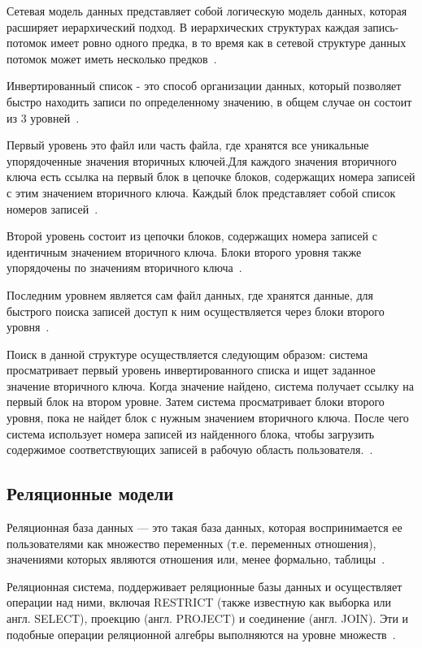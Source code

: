 Сетевая модель данных представляет собой логическую модель данных, которая расширяет иерархический подход. В иерархических структурах каждая запись-потомок имеет ровно одного предка, в то время как в сетевой структуре данных потомок может иметь несколько предков~\cite{wolf-db}.


Инвертированный список - это способ организации данных, который позволяет быстро находить записи по определенному значению, в общем случае он состоит из 3 уровней~\cite{inverted-lists}. 

Первый уровень это файл или часть файла, где хранятся все уникальные упорядоченные значения вторичных ключей.Для каждого значения вторичного ключа есть ссылка на первый блок в цепочке блоков, содержащих номера записей с этим значением вторичного ключа. Каждый блок представляет собой список номеров записей~\cite{inverted-lists}.

Второй уровень состоит из цепочки блоков, содержащих номера записей с идентичным значением вторичного ключа. Блоки второго уровня также упорядочены по значениям вторичного ключа~\cite{inverted-lists}.

Последним уровнем является сам файл данных, где хранятся данные, для быстрого поиска записей доступ к ним осуществляется через блоки второго уровня~\cite{inverted-lists}.

Поиск в данной структуре осуществляется следующим образом: система просматривает первый уровень инвертированного списка и ищет заданное значение вторичного ключа. Когда значение найдено, система получает ссылку на первый блок на втором уровне. Затем система просматривает блоки второго уровня, пока не найдет блок с нужным значением вторичного ключа. После чего система использует номера записей из найденного блока, чтобы загрузить содержимое соответствующих записей в рабочую область пользователя.~\cite{inverted-lists}.




\subsection{Реляционные модели}
Реляционная база данных — это такая база данных, которая воспринимается ее пользователями как множество переменных (т.е. переменных отношения), значениями которых являются отношения или, менее формально, таблицы~\cite{williams-db}.

Реляционная система, поддерживает реляционные базы данных и осуществляет операции над ними, включая RESTRICT (также известную как выборка или англ. SELECT), проекцию (англ. PROJECT) и соединение (англ. JOIN). Эти и подобные операции реляционной алгебры выполняются на уровне множеств~\cite{williams-db}.

